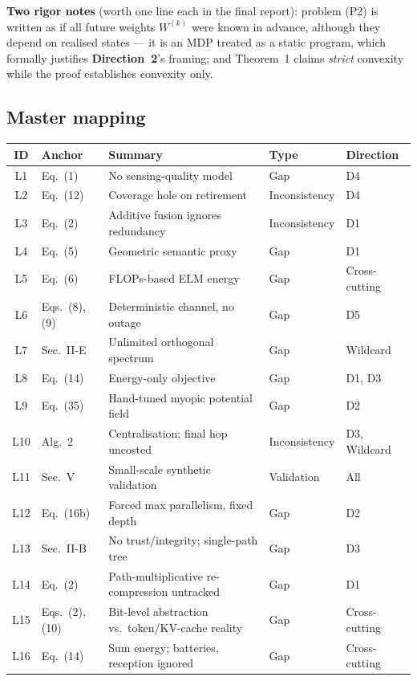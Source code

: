\documentclass[11pt,a4paper]{article}
\newcommand{\Dir}[1]{\textcolor{accent}{\textbf{Direction~#1}}}
\begin{document}
\medskip
\noindent\textbf{Two rigor notes} (worth one line each in the final report): problem (P2) is written as if all future weights $W^{(k)}$ were known in advance, although they depend on realised states --- it is an MDP treated as a static program, which formally justifies \Dir{2}'s framing; and Theorem~1 claims \emph{strict} convexity while the proof establishes convexity only.

\subsection{Master mapping}
\begin{center}\footnotesize
\renewcommand{\arraystretch}{1.18}
\begin{longtable}{@{}c l p{6.9cm} l l@{}}
\toprule
\textbf{ID} & \textbf{Anchor} & \textbf{Summary} & \textbf{Type} & \textbf{Direction} \\
\midrule
\endhead
L1 & Eq.~(1) & No sensing-quality model & Gap & D4 \\
L2 & Eq.~(12) & Coverage hole on retirement & Inconsistency & D4 \\
L3 & Eq.~(2) & Additive fusion ignores redundancy & Inconsistency & D1 \\
L4 & Eq.~(5) & Geometric semantic proxy & Gap & D1 \\
L5 & Eq.~(6) & FLOPs-based ELM energy & Gap & Cross-cutting \\
L6 & Eqs.~(8),(9) & Deterministic channel, no outage & Gap & D5 \\
L7 & Sec.~II-E & Unlimited orthogonal spectrum & Gap & Wildcard \\
L8 & Eq.~(14) & Energy-only objective & Gap & D1, D3 \\
L9 & Eq.~(35) & Hand-tuned myopic potential field & Gap & D2 \\
L10 & Alg.~2 & Centralisation; final hop uncosted & Inconsistency & D3, Wildcard \\
L11 & Sec.~V & Small-scale synthetic validation & Validation & All \\
L12 & Eq.~(16b) & Forced max parallelism, fixed depth & Gap & D2 \\
L13 & Sec.~II-B & No trust/integrity; single-path tree & Gap & D3 \\
L14 & Eq.~(2) & Path-multiplicative re-compression untracked & Gap & D1 \\
L15 & Eqs.~(2),(10) & Bit-level abstraction vs.\ token/KV-cache reality & Gap & Cross-cutting \\
L16 & Eq.~(14) & Sum energy; batteries, reception ignored & Gap & Cross-cutting \\

\end{longtable}
\end{center}
\end{document}
